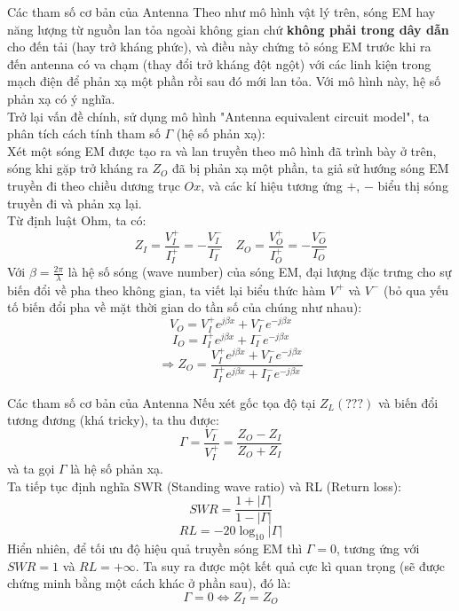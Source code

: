 \documentclass[8pt]{beamer}
\begin{document}
\begin{frame}{Các tham số cơ bản của Antenna}
	Theo như mô hình vật lý trên, sóng EM hay năng lượng từ nguồn lan tỏa ngoài không gian chứ \textbf{không phải trong dây dẫn} cho đến tải (hay trở kháng phức), và điều này chứng tỏ sóng EM trước khi ra đến antenna có va chạm (thay đổi trở kháng đột ngột) với các linh kiện trong mạch điện để phản xạ một phần rồi sau đó mới lan tỏa. Với mô hình này, \alert{hệ số phản xạ có ý nghĩa}.
\\Trở lại vấn đề chính, sử dụng mô hình "Antenna equivalent circuit model", ta phân tích cách tính tham số $\Gamma$ (hệ số phản xạ):
\\ Xét một sóng EM được tạo ra và lan truyền theo mô hình đã trình bày ở trên, sóng khi gặp trở kháng ra $Z_{O}$ đã bị phản xạ một phần, ta giả sử hướng sóng EM truyền đi theo chiều dương trục $Ox$, và các kí hiệu tương ứng $+$, $-$ biểu thị sóng truyền đi và phản xạ lại.
\\ Từ định luật Ohm, ta có:
$$Z_{I}=\frac{V_{I}^+}{I_{I}^+}=-\frac{V^-_{I}}{I^-_{I}}\quad Z_{O}=\frac{V^+_{O}}{I^+_{O}}=-\frac{V^-_{O}}{I^-_{O}}$$
Với $\beta=\frac{2\pi}{\lambda}$ là hệ số sóng (wave number) của sóng EM, đại lượng đặc trưng cho sự biến đổi về pha theo không gian, ta viết lại biểu thức hàm $V^+$ và $V^-$ (bỏ qua yếu tố biến đổi pha về mặt thời gian do tần số của chúng như nhau):
$$V_{O}=V_{I}^+ e^{j\beta x}+V_{I}^- e^{-j\beta x}$$
$$I_{O}=I_{I}^+ e^{j\beta x}+I_{I}^- e^{-j\beta x}$$
$$\Rightarrow Z_{O}=\frac{V_{I}^+ e^{j\beta x}+V_{I}^- e^{-j\beta x}}{I_{I}^+ e^{j\beta x}+I_{I}^- e^{-j\beta x}}$$
\end{frame}
\begin{frame}{Các tham số cơ bản của Antenna}
Nếu xét gốc tọa độ tại $Z_{L} (???)$ và biến đổi tương đương (khá tricky), ta thu được:
$$\Gamma=\frac{V_{I}^-}{V_{I}^+}=\frac{Z_{O}-Z_{I}}{Z_{O}+Z_{I}}$$
và ta gọi $\Gamma$ là \alert{hệ số phản xạ}.
\\Ta tiếp tục định nghĩa SWR (Standing wave ratio) và RL (Return loss):
$$SWR=\frac{1+|\Gamma|}{1-|\Gamma|}$$
$$RL=-20\log_{10}|\Gamma|$$
Hiển nhiên, để tối ưu độ hiệu quả truyền sóng EM thì $\Gamma=0$, tương ứng với $SWR=1$ và $RL=+\infty$. Ta suy ra được một kết quả cực kì quan trọng (sẽ được chứng minh bằng một cách khác ở phần sau), đó là:
$$\Gamma=0\Leftrightarrow Z_{I}=Z_{O}$$
\end{frame}
\end{document}
